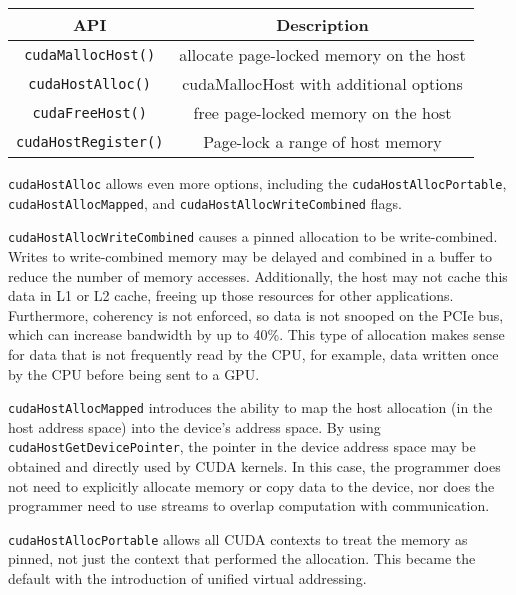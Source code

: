 \begin{table}[h]
    \centering
    \caption[CUDA Pinned Memory-Management APIs]{}
    \label{tab:cuda-pinned-apis}
    \begin{tabular}{|c|c|}
    \hline
    \textbf{API}                & \textbf{Description} \\ \hline
    \texttt{cudaMallocHost()}   & allocate page-locked memory on the host\\ \hline
    \texttt{cudaHostAlloc()}    & cudaMallocHost with additional options \\ \hline
    \texttt{cudaFreeHost()}     & free page-locked memory on the host\\ \hline
    \texttt{cudaHostRegister()} & Page-lock a range of host memory \\ \hline
    \end{tabular}
\end{table}

\texttt{cudaHostAlloc} allows even more options, including the \texttt{cudaHostAllocPortable}, \texttt{cudaHostAllocMapped}, and \texttt{cudaHostAllocWriteCombined} flags.

\texttt{cudaHostAllocWriteCombined} causes a pinned allocation to be write-combined.
Writes to write-combined memory may be delayed and combined in a buffer to reduce the number of memory accesses.
Additionally, the host may not cache this data in L1 or L2 cache, freeing up those resources for other applications. 
Furthermore, coherency is not enforced, so data is not snooped on the PCIe bus, which can increase bandwidth by up to 40\%.
This type of allocation makes sense for data that is not frequently read by the CPU, for example, data written once by the CPU before being sent to a GPU.

\texttt{cudaHostAllocMapped} introduces the ability to map the host allocation (in the host address space) into the device's address space.
By using \texttt{cudaHostGetDevicePointer}, the pointer in the device address space may be obtained and directly used by CUDA kernels.
In this case, the programmer does not need to explicitly allocate memory or copy data to the device, nor does the programmer need to use streams to overlap computation with communication.

\texttt{cudaHostAllocPortable} allows all CUDA contexts to treat the memory as pinned, not just the context that performed the allocation.
This became the default with the introduction of unified virtual addressing. 


